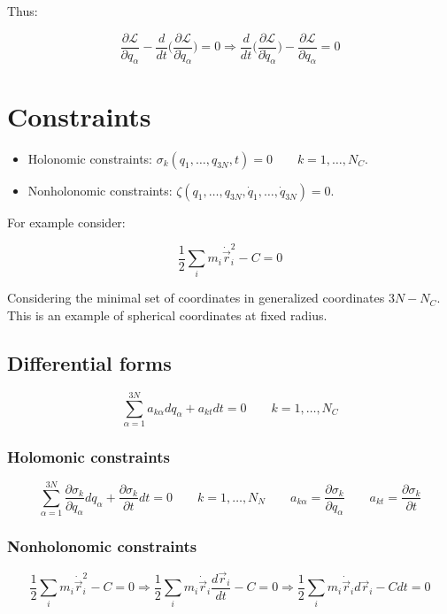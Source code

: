 	Thus:

	$$\frac{\partial\mathcal{L}}{\partial q_\alpha} - \frac{d}{dt}\biggl(\frac{\partial\mathcal{L}}{\partial\dot{q}_\alpha}\biggr) = 0\Rightarrow \frac{d}{dt}\biggl(\frac{\partial\mathcal{L}}{\partial\dot{q}_\alpha}\biggr)-\frac{\partial\mathcal{L}}{\partial q_\alpha} = 0$$

\section{Constraints}

\begin{itemize}
	\item Holonomic constraints: $\sigma_k(q_1, \dots, q_{3N}, t) = 0\qquad k = 1, \dots, N_C$.
	\item Nonholonomic constraints: $\zeta(q_1, \dots, q_{3N}, \dot{q}_1, \dots, \dot{q}_{3N}) = 0$.
\end{itemize}

For example consider:

$$\frac{1}{2}\sum\limits_{i}m_i\dot{\vec{r}}_i^2-C = 0$$

Considering the minimal set of coordinates in generalized coordinates $3N-N_C$.
This is an example of spherical coordinates at fixed radius.

	\subsection{Differential forms}

	$$\sum\limits_{\alpha = 1}^{3N} a_{k\alpha}dq_\alpha + a_{kt}dt = 0\qquad k = 1, \dots, N_C$$


		\subsubsection{Holomonic constraints}

		$$\sum\limits_{\alpha=1}^{3N}\frac{\partial\sigma_k}{\partial q_\alpha}dq_\alpha + \frac{\partial\sigma_k}{\partial t} dt = 0\qquad k = 1, \dots, N_N\qquad a_{k\alpha} = \frac{\partial\sigma_k}{\partial q_\alpha}\qquad a _{kt} = \frac{\partial\sigma_k}{\partial t}$$

		\subsubsection{Nonholonomic constraints}

		$$\frac{1}{2}\sum\limits_i m_i\dot{\vec{r}}_i^2 - C = 0\Rightarrow\frac{1}{2}\sum\limits_i m_i\dot{\vec{r}}_i\frac{d\vec{r}_i}{dt} - C = 0\Rightarrow\frac{1}{2}\sum\limits_i m_i\dot{\vec{r}}_id\vec{r}_i-Cdt = 0$$

